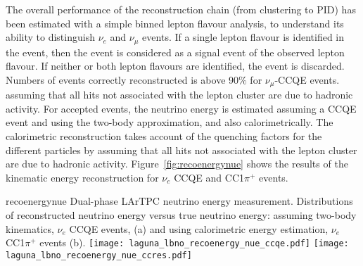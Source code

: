 The overall performance of the reconstruction chain (from clustering to PID) has been estimated with a simple binned lepton flavour analysis, 
to understand its ability to distinguish $\nu_{e}$ and $\nu_{\mu}$ events.
If a single lepton flavour is identified in the event, then the event is considered as a signal event of the observed lepton flavour. 
If neither or both lepton flavours are identified, the event is discarded.
Numbers of events correctly reconstructed is above 90$\%$ for $\nu_{\mu}$-CCQE events.
assuming that all hits not associated with the lepton cluster are due to hadronic activity.
For accepted events, the neutrino energy is estimated  assuming a CCQE event and using the two-body approximation, and also calorimetrically.
The calorimetric reconstruction takes account of the quenching factors for the different particles by 
assuming that all hits not associated with the lepton cluster are due to hadronic activity.
Figure~\ref{fig:recoenergynue} shows the results of the kinematic energy reconstruction for $\nu_e$ CCQE and CC1$\pi^{+}$ events.

\begin{cdrfigure}{recoenergynue}
{Dual-phase LArTPC neutrino energy measurement. Distributions of reconstructed neutrino energy versus true neutrino energy: assuming two-body kinematics,  $\nu_{e}$ CCQE events, (a) 
and using calorimetric energy estimation, $\nu_{e}$  CC1$\pi^{+}$ events (b).}
\texttt{[image: laguna\_lbno\_recoenergy\_nue\_ccqe.pdf]}
\texttt{[image: laguna\_lbno\_recoenergy\_nue\_ccres.pdf]}
\end{cdrfigure}









